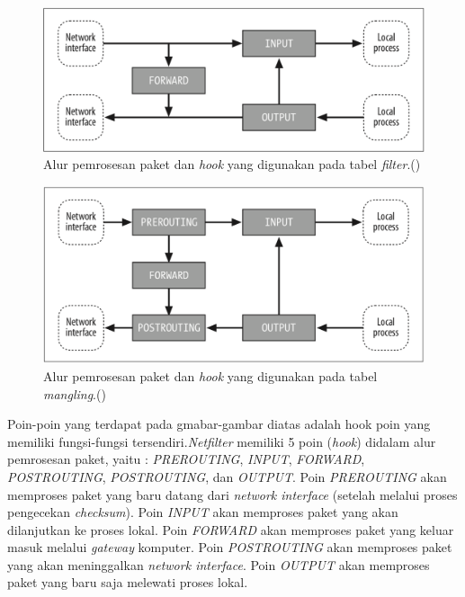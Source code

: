 \begin{figure}[H]
	\centering
	\includegraphics[width=\textwidth]{resources/filter_table.png}
	\caption{Alur pemrosesan paket dan \textit{hook} yang digunakan pada tabel \textit{filter}.(\cite{purdy2004linux})}
	\label{fig:packetflow_filter}
\end{figure}

\begin{figure}[H]
	\centering
	\includegraphics[width=\textwidth]{resources/mangling_table.png}
	\caption{Alur pemrosesan paket dan \textit{hook} yang digunakan pada tabel \textit{mangling}.(\cite{purdy2004linux})}
	\label{fig:packetflow_mangling}
\end{figure}

Poin-poin yang terdapat pada gmabar-gambar diatas adalah hook poin yang memiliki fungsi-fungsi tersendiri.\textit{Netfilter} memiliki 5 poin (\textit{hook}) didalam alur pemrosesan paket, yaitu : \textit{PREROUTING}, \textit{INPUT}, \textit{FORWARD}, \textit{POSTROUTING}, \textit{POSTROUTING}, dan  \textit{OUTPUT}. 
Poin \textit{PREROUTING} akan memproses paket yang baru datang dari \textit{network interface} (setelah melalui proses pengecekan \textit{checksum}).
Poin \textit{INPUT} akan memproses paket yang akan dilanjutkan ke proses lokal.
Poin \textit{FORWARD} akan memproses paket yang keluar masuk melalui \textit{gateway} komputer.
Poin \textit{POSTROUTING} akan memproses paket yang akan meninggalkan \textit{network interface}.
Poin \textit{OUTPUT} akan memproses paket yang baru saja melewati proses lokal.


